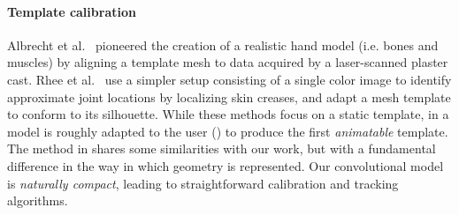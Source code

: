 
\paragraph{Template calibration}
Albrecht et al.~ pioneered the creation of a realistic hand model (i.e. bones and muscles) by aligning a template mesh to data acquired by a laser-scanned plaster cast. Rhee et al.~ use a simpler setup consisting of a single color image to identify approximate joint locations by localizing skin creases, and adapt a mesh template to conform to its silhouette. While these methods focus on a static template, in \cite{delagorce2011model} a model is roughly adapted to the user () to produce the first \emph{animatable} template. 
% 
% 
The method in \cite{taylor2014user} shares some similarities with our work, but with a fundamental difference in the way in which geometry is represented. Our convolutional model is \emph{naturally compact}, leading to straightforward calibration and tracking algorithms.

